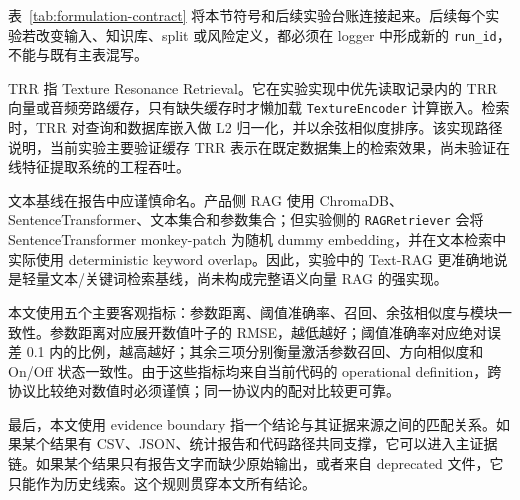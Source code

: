 \begin{table}[H]
	\centering
	\caption{检索式可编辑参数控制的 formal contract。}
	\label{tab:formulation-contract}
	\small
\end{table}

表~\ref{tab:formulation-contract} 将本节符号和后续实验台账连接起来。后续每个实验若改变输入、知识库、split 或风险定义，都必须在 logger 中形成新的 \texttt{run\_id}，不能与既有主表混写。

TRR 指 Texture Resonance Retrieval。它在实验实现中优先读取记录内的 TRR 向量或音频旁路缓存，只有缺失缓存时才懒加载 \texttt{TextureEncoder} 计算嵌入。检索时，TRR 对查询和数据库嵌入做 L2 归一化，并以余弦相似度排序。该实现路径说明，当前实验主要验证缓存 TRR 表示在既定数据集上的检索效果，尚未验证在线特征提取系统的工程吞吐。

文本基线在报告中应谨慎命名。产品侧 RAG 使用 ChromaDB、SentenceTransformer、文本集合和参数集合；但实验侧的 \texttt{RAGRetriever} 会将 SentenceTransformer monkey-patch 为随机 dummy embedding，并在文本检索中实际使用 deterministic keyword overlap。因此，实验中的 Text-RAG 更准确地说是轻量文本/关键词检索基线，尚未构成完整语义向量 RAG 的强实现。

本文使用五个主要客观指标：参数距离、阈值准确率、召回、余弦相似度与模块一致性。参数距离对应展开数值叶子的 RMSE，越低越好；阈值准确率对应绝对误差 0.1 内的比例，越高越好；其余三项分别衡量激活参数召回、方向相似度和 On/Off 状态一致性。由于这些指标均来自当前代码的 operational definition，跨协议比较绝对数值时必须谨慎；同一协议内的配对比较更可靠。

最后，本文使用 evidence boundary 指一个结论与其证据来源之间的匹配关系。如果某个结果有 CSV、JSON、统计报告和代码路径共同支撑，它可以进入主证据链。如果某个结果只有报告文字而缺少原始输出，或者来自 deprecated 文件，它只能作为历史线索。这个规则贯穿本文所有结论。
